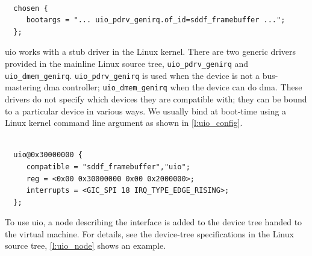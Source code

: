 \documentclass[a4paper,12pt]{report}
\newcommand{\code}[1]{\texttt{#1}}
\begin{document}
\begin{lstlisting}[gobble=2,firstline=2,float=th,tabsize=2,
  label={l:uio_config},
  caption={Example \gls{uio} stub driver command-line configurations.}]

  chosen {
     bootargs = "... uio_pdrv_genirq.of_id=sddf_framebuffer ...";
  };
\end{lstlisting}

\gls{uio} works with a stub driver in the Linux kernel.  There are two
generic drivers provided in the mainline Linux source tree,
\code{uio\_pdrv\_genirq} and \code{uio\_dmem\_genirq}.
\code{uio\_pdrv\_genirq} is used when the device is not a
bus-mastering \gls{dma} controller; \code{uio\_dmem\_genirq} when the device
can do \gls{dma}.  These drivers do not specify which devices they are
compatible with; they can be bound to a particular device in various
ways.  We usually bind at boot-time using a Linux kernel command line
argument as shown in \autoref{l:uio_config}.

\begin{lstlisting}[gobble=2,firstline=2,float=th,tabsize=2,
  label={l:uio_node},
  caption={Example \gls{uio} node in device tree.}]

  uio@0x30000000 {
     compatible = "sddf_framebuffer","uio";
     reg = <0x00 0x30000000 0x00 0x2000000>;
     interrupts = <GIC_SPI 18 IRQ_TYPE_EDGE_RISING>;
  };
\end{lstlisting}

To use \gls{uio}, a node describing the interface is added to the device
tree handed to the virtual machine.  For details, see the device-tree
specifications in the Linux source tree, \autoref{l:uio_node} shows an
example.
\end{document}
